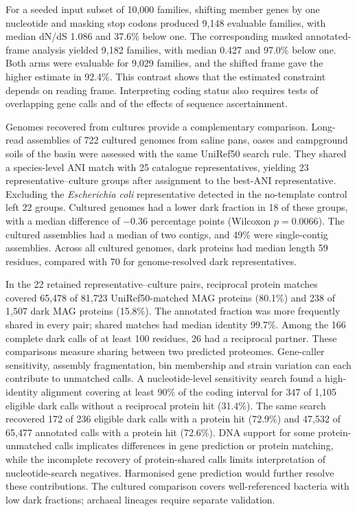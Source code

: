 \documentclass[11pt]{article}
\begin{document}
For a seeded input subset of 10{,}000 families, shifting member genes by one nucleotide and
masking stop codons produced 9{,}148 evaluable families, with median dN/dS 1.086 and 37.6\%
below one. The corresponding masked annotated-frame analysis yielded 9{,}182 families, with
median 0.427 and 97.0\% below one. Both arms were evaluable for 9{,}029 families, and the shifted
frame gave the higher estimate in 92.4\%. This contrast shows that the estimated constraint
depends on reading frame. Interpreting coding status also requires tests of overlapping gene
calls and of the effects of sequence ascertainment.

Genomes recovered from cultures provide a complementary comparison. Long-read assemblies of
722 cultured genomes from saline pans, oases and campground soils of the basin were assessed
with the same UniRef50 search rule. They shared a species-level ANI match with 25 catalogue
representatives, yielding 23 representative--culture groups after assignment to the best-ANI
representative. Excluding the \emph{Escherichia coli} representative detected in the no-template
control left 22 groups. Cultured genomes had a lower dark fraction in 18 of these groups,
with a median difference of $-0.36$ percentage points (Wilcoxon $p = 0.0066$).
The cultured assemblies had a median of two contigs, and 49\% were single-contig assemblies.
Across all cultured genomes, dark proteins had median length 59 residues, compared with 70 for
genome-resolved dark representatives.

In the 22 retained representative--culture pairs, reciprocal protein matches covered 65{,}478
of 81{,}723 UniRef50-matched MAG proteins (80.1\%) and 238 of 1{,}507 dark MAG proteins (15.8\%).
The annotated fraction was more frequently shared in every pair; shared matches had median
identity 99.7\%. Among the 166 complete dark calls of at least 100 residues, 26 had a reciprocal
partner. These comparisons measure sharing between two predicted proteomes. Gene-caller
sensitivity, assembly fragmentation, bin membership and strain variation can each contribute to
unmatched calls. A nucleotide-level sensitivity search found a high-identity alignment covering at least 90\%
of the coding interval for 347 of 1{,}105 eligible dark calls without a reciprocal protein hit
(31.4\%). The same search recovered 172 of 236 eligible dark calls with a protein hit (72.9\%)
and 47{,}532 of 65{,}477 annotated calls with a protein hit (72.6\%). DNA support for some
protein-unmatched calls implicates differences in gene prediction or protein matching, while
the incomplete recovery of protein-shared calls limits interpretation of nucleotide-search negatives.
Harmonised gene prediction would further resolve these contributions. The cultured comparison covers well-referenced bacteria with low dark
fractions; archaeal lineages require separate validation.
\end{document}
